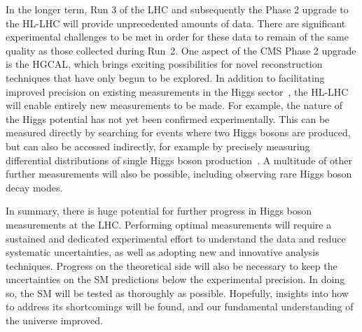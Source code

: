 In the longer term, Run 3 of the LHC and subsequently the Phase 2 upgrade to the HL-LHC 
will provide unprecedented amounts of data.
There are significant experimental challenges to be met in order for these data 
to remain of the same quality as those collected during Run~2.
One aspect of the CMS Phase 2 upgrade is the HGCAL, 
which brings exciting possibilities for novel reconstruction techniques 
that have only begun to be explored.
In addition to facilitating improved precision on existing measurements 
in the Higgs sector~\cite{FutureYR}, the HL-LHC will enable entirely new measurements to be made.
For example, the nature of the Higgs potential has not yet been confirmed experimentally.
This can be measured directly by searching for events where two Higgs bosons are produced, 
but can also be accessed indirectly, 
for example by precisely measuring differential distributions 
of single Higgs boson production~\cite{JonnoPAS}.
A multitude of other further measurements will also be possible, 
including observing rare Higgs boson decay modes.

In summary, there is huge potential for further progress in Higgs boson measurements at the LHC.
Performing optimal measurements will require a sustained and dedicated experimental effort
to understand the data and reduce systematic uncertainties, 
as well as adopting new and innovative analysis techniques.
Progress on the theoretical side will also be necessary 
to keep the uncertainties on the SM predictions below the experimental precision.
In doing so, the SM will be tested as thoroughly as possible.
Hopefully, insights into how to address its shortcomings will be found,
and our fundamental understanding of the universe improved.
